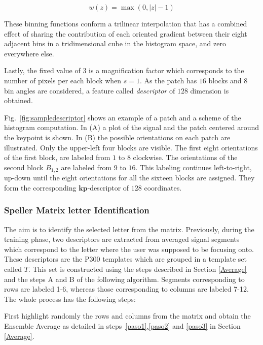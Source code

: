 \documentclass[utf8]{frontiersSCNS} %
\begin{document}
\begin{equation}
 w(z) = \max(0,|z|-1)
\label{eq:weighting}
\end{equation}

These binning functions conform a trilinear interpolation that has a combined effect of sharing the contribution of each oriented gradient between their eight adjacent bins in a tridimensional cube in the histogram space, and zero everywhere else.

Lastly, the fixed value of $ 3 $ is a magnification factor which corresponds to the number of pixels per each block when $s = 1$.  As the patch has  $16$ blocks and  $8$ bin angles are considered, a feature called \textit{descriptor} of $128$ dimension is obtained. 

Fig.~\ref{fig:sampledescriptor} shows an example of a patch and a scheme of the histogram computation. In (A) a plot of the signal and the patch centered around the keypoint is shown. In (B) the possible orientations on each patch are illustrated.  Only the upper-left four blocks are visible.  The first eight orientations of the first block, are labeled from $1$ to $8$ clockwise. The orientations of the second block $ B_{1,2} $ are labeled from $9$ to $16$.  This labeling continues left-to-right, up-down until the eight orientations for all the sixteen blocks are assigned. They form the corresponding $\mathbf{kp}$-descriptor of $128$ coordinates.
 
\subsubsection{Speller Matrix letter Identification}
\label{Classification}

The aim is to identify the selected letter from the matrix. Previously, during the training phase, two descriptors are extracted from averaged signal segments which correspond to the letter where the user was supposed to be focusing onto.  These descriptors are the P300 templates which are grouped in a template set called $ T $.  This set is constructed using the steps described in Section \ref{Average} and the steps A and B of the following algorithm.  Segments corresponding to rows are labeled 1-6, whereas those corresponding to columns are labeled 7-12.  The whole process has the following steps:

First highlight randomly the rows and columns from the matrix and obtain the Ensemble Average as detailed in steps~\ref{paso1},\ref{paso2} and \ref{paso3} in Section \ref{Average}.
\end{document}
